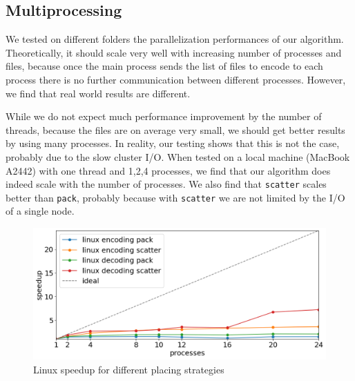 \subsection{Multiprocessing}
We tested on different folders the parallelization performances of our algorithm. Theoretically, it should scale very well with increasing number of processes and files, because once the main process sends the list of files to encode to each process there is no further communication between different processes. However, we find that real world results are different.

While we do not expect much performance improvement by the number of threads, because the files are on average very small, we should get better results by using many processes. In reality, our testing shows that this is not the case, probably due to the slow cluster I/O. When tested on a local machine (MacBook A2442) with one thread and 1,2,4 processes, we find that our algorithm does indeed scale with the number of processes.
We also find that \verb|scatter| scales better than \verb|pack|, probably because with \verb|scatter| we are not limited by the I/O of a single node.
\begin{figure}
	\centering
	\includegraphics[width=1\linewidth]{"../imgs/linux speedup"}
	\caption{Linux speedup for different placing strategies}
	\label{fig:linux-scatter-pack}
\end{figure}

